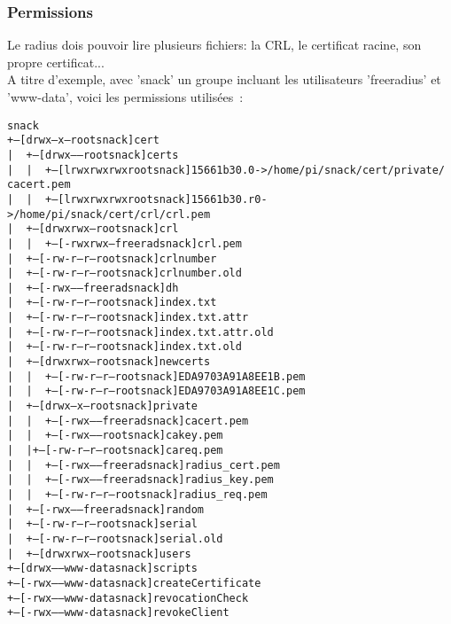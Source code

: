 \subsubsection{Permissions}
Le radius dois pouvoir lire plusieurs fichiers: la CRL, le certificat racine, son propre certificat...\\
A titre d'exemple, avec 'snack' un groupe incluant les utilisateurs 'freeradius' et 'www-data', voici les permissions utilisées~:
\begin{alltt}
snack
+-- [drwx--x--- root     snack   ]  cert
|   +-- [drwx------ root     snack   ]  certs
|   |   +-- [lrwxrwxrwx root     snack   ]  15661b30.0 -> /home/pi/snack/cert/private/
									    cacert.pem
|   |   +-- [lrwxrwxrwx root     snack   ]  15661b30.r0 -> /home/pi/snack/cert/crl/crl.pem
|   +-- [drwxrwx--- root     snack   ]  crl
|   |   +-- [-rwxrwx--- freerad  snack   ]  crl.pem
|   +-- [-rw-r--r-- root     snack   ]  crlnumber
|   +-- [-rw-r--r-- root     snack   ]  crlnumber.old
|   +-- [-rwx------ freerad  snack   ]  dh
|   +-- [-rw-r--r-- root     snack   ]  index.txt
|   +-- [-rw-r--r-- root     snack   ]  index.txt.attr
|   +-- [-rw-r--r-- root     snack   ]  index.txt.attr.old
|   +-- [-rw-r--r-- root     snack   ]  index.txt.old
|   +-- [drwxrwx--- root     snack   ]  newcerts
|   |   +-- [-rw-r--r-- root     snack   ]  EDA9703A91A8EE1B.pem
|   |   +-- [-rw-r--r-- root     snack   ]  EDA9703A91A8EE1C.pem
|   +-- [drwx--x--- root     snack   ]  private
|   |   +-- [-rwx------ freerad  snack   ]  cacert.pem
|   |   +-- [-rwx------ root     snack   ]  cakey.pem
|   |   +-- [-rw-r--r-- root     snack   ]  careq.pem
|   |   +-- [-rwx------ freerad  snack   ]  radius_cert.pem
|   |   +-- [-rwx------ freerad  snack   ]  radius_key.pem
|   |   +-- [-rw-r--r-- root     snack   ]  radius_req.pem
|   +-- [-rwx------ freerad  snack   ]  random
|   +-- [-rw-r--r-- root     snack   ]  serial
|   +-- [-rw-r--r-- root     snack   ]  serial.old
|   +-- [drwxrwx--- root     snack   ]  users
+-- [drwx------ www-data snack   ]  scripts
    +-- [-rwx------ www-data snack   ]  createCertificate
    +-- [-rwx------ www-data snack   ]  revocationCheck
    +-- [-rwx------ www-data snack   ]  revokeClient
\end{alltt}



